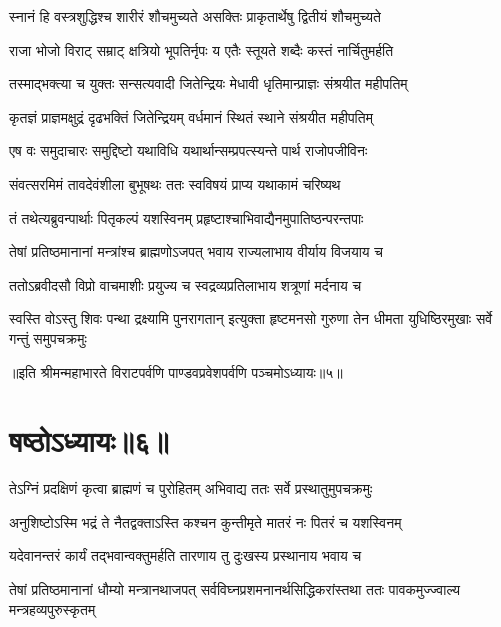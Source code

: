 \twolineshloka
{स्नानं हि वस्त्रशुद्धिश्च शारीरं शौचमुच्यते}
{असक्तिः प्राकृतार्थेषु द्वितीयं शौचमुच्यते}


\twolineshloka
{राजा भोजो विराट् सम्राट् क्षत्रियो भूपतिर्नृपः}
{य एतैः स्तूयते शब्दैः कस्तं नार्चितुमर्हति}


\twolineshloka
{तस्माद्भक्त्या च युक्तः सन्सत्यवादी जितेन्द्रियः}
{मेधावी धृतिमान्प्राज्ञः संश्रयीत महीपतिम्}


\twolineshloka
{कृतज्ञं प्राज्ञमक्षुद्रं दृढभक्तिं जितेन्द्रियम्}
{वर्धमानं स्थितं स्थाने संश्रयीत महीपतिम्}


\twolineshloka
{एष वः समुदाचारः समुद्दिष्टो यथाविधि}
{यथार्थान्सम्प्रपत्स्यन्ते पार्थ राजोपजीविनः}


\twolineshloka
{संवत्सरमिमं तावदेवंशीला बुभूषथः}
{ततः स्वविषयं प्राप्य यथाकामं चरिष्यथ}



\twolineshloka
{तं तथेत्यब्रुवन्पार्थाः पितृकल्पं यशस्विनम्}
{प्रहृष्टाश्चाभिवाद्यैनमुपातिष्ठन्परन्तपाः}


\twolineshloka
{तेषां प्रतिष्ठमानानां मन्त्रांश्च ब्राह्मणोऽजपत्}
{भवाय राज्यलाभाय वीर्याय विजयाय च}


\twolineshloka
{ततोऽब्रवीदसौ विप्रो वाचमाशीः प्रयुज्य च}
{स्वद्रव्यप्रतिलाभाय शत्रूणां मर्दनाय च}


\threelineshloka
{स्वस्ति वोऽस्तु शिवः पन्था द्रक्ष्यामि पुनरागतान्}
{इत्युक्ता हृष्टमनसो गुरुणा तेन धीमता}
{युधिष्ठिरमुखाः सर्वे गन्तुं समुपचक्रमुः}

॥इति श्रीमन्महाभारते विराटपर्वणि पाण्डवप्रवेशपर्वणि पञ्चमोऽध्यायः॥५॥

\chapter{षष्ठोऽध्यायः॥६॥}

\twolineshloka
{तेऽग्निं प्रदक्षिणं कृत्वा ब्राह्मणं च पुरोहितम्}
{अभिवाद्य ततः सर्वे प्रस्थातुमुपचक्रमुः}




\twolineshloka
{अनुशिष्टोऽस्मि भद्रं ते नैतद्वक्ताऽस्ति कश्चन}
{कुन्तीमृते मातरं नः पितरं च यशस्विनम्}


\twolineshloka
{यदेवानन्तरं कार्यं तद्भवान्वक्तुमर्हति}
{तारणाय तु दुःखस्य प्रस्थानाय भवाय च}



\threelineshloka
{तेषां प्रतिष्ठमानानां धौम्यो मन्त्रानथाजपत्}
{सर्वविघ्नप्रशमनानर्थसिद्धिकरांस्तथा}
{ततः पावकमुज्ज्वाल्य मन्त्रहव्यपुरुस्कृतम्}


